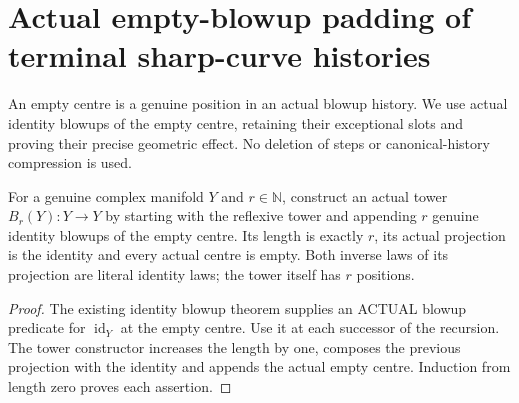 \section{Actual empty-blowup padding of terminal sharp-curve histories}

An empty centre is a genuine position in an actual blowup history. We use
actual identity blowups of the empty centre, retaining their exceptional
slots and proving their precise geometric effect. No deletion of steps
or canonical-history compression is used.

\begin{definition}
\label{hir:sharp-actual-identity-empty-padding}
\leanok
For a genuine complex manifold $Y$ and $r\in\mathbb N$, construct an
actual tower $B_r(Y):Y\to Y$ by starting with the reflexive tower and
appending $r$ genuine identity blowups of the empty centre. Its length
is exactly $r$, its actual projection is the identity and every actual
centre is empty. Both inverse laws of its projection are literal
identity laws; the tower itself has $r$ positions.
\end{definition}
\begin{proof}
The existing identity blowup theorem supplies an ACTUAL blowup predicate
for $\operatorname{id}_Y$ at the empty centre. Use it at each successor
of the recursion. The tower constructor increases the length by one,
composes the previous projection with the identity and appends the
actual empty centre. Induction from length zero proves each assertion.
\end{proof}

